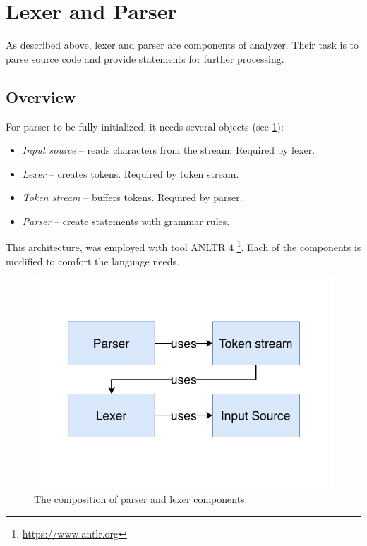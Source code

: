 \section{Lexer and Parser}
\label{lab06:parser}

As described above, lexer and parser are components of analyzer. Their task is to parse source code and provide statements for further processing.

\subsection{Overview}

For parser to be fully initialized, it needs several objects (see \cref{fig06:pars_lex}):
\begin{itemize}
	\item \emph{Input source} -- reads characters from the stream. Required by lexer.
	\item \emph{Lexer} -- creates tokens. Required by token stream.
	\item \emph{Token stream} -- buffers tokens. Required by parser.
	\item \emph{Parser} -- create statements with grammar rules.
\end{itemize}

This architecture, was employed with tool ANLTR 4 \footnote{\url{https://www.antlr.org}}. Each of the components is modified to comfort the language needs.

\begin{figure}
	\centering
	\includegraphics[width=\textwidth/2]{img/parser_lexer_arch}
	\caption{The composition of parser and lexer components.}
	\label{fig06:pars_lex}
\end{figure}

